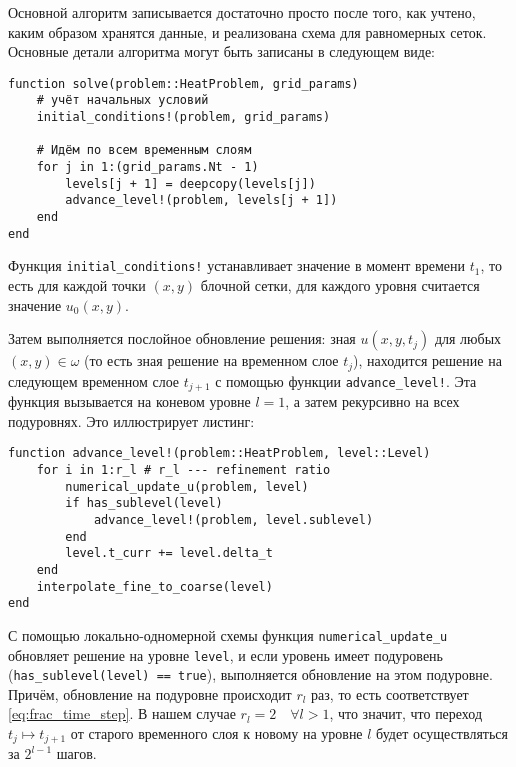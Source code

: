 Основной алгоритм записывается достаточно просто после того, как учтено, каким образом хранятся данные, и реализована схема для равномерных сеток.
Основные детали алгоритма могут быть записаны в следующем виде:
\begin{verbatim}
function solve(problem::HeatProblem, grid_params)
    # учёт начальных условий
    initial_conditions!(problem, grid_params)

    # Идём по всем временным слоям
    for j in 1:(grid_params.Nt - 1)
        levels[j + 1] = deepcopy(levels[j])
        advance_level!(problem, levels[j + 1])
    end
end
\end{verbatim}
Функция \texttt{initial\_conditions!} устанавливает значение в момент времени $t_1$, то есть для каждой точки $(x, y)$ блочной сетки, для каждого уровня считается значение $u_0(x, y)$.

Затем выполняется послойное обновление решения: зная $u(x, y, t_j)$ для любых $(x, y) \in \omega$ (то есть зная решение на временном слое $t_j$), находится решение на следующем временном слое $t_{j + 1}$ с помощью функции \texttt{advance\_level!}.
Эта функция вызывается на коневом уровне $l = 1$, а затем рекурсивно на всех подуровнях.
Это иллюстрирует листинг:
\begin{verbatim}
function advance_level!(problem::HeatProblem, level::Level)
    for i in 1:r_l # r_l --- refinement ratio
        numerical_update_u(problem, level)
        if has_sublevel(level)
            advance_level!(problem, level.sublevel)
        end
        level.t_curr += level.delta_t
    end
    interpolate_fine_to_coarse(level)
end
\end{verbatim}
С помощью локально-одномерной схемы функция \texttt{numerical\_update\_u} обновляет решение на уровне \texttt{level}, и если уровень имеет подуровень (\texttt{has\_sublevel(level) == true}), выполняется обновление на этом подуровне.
Причём, обновление на подуровне происходит $r_l$ раз, то есть соответствует \eqref{eq:frac_time_step}.
В нашем случае $r_l = 2 \quad \forall l > 1$, что значит, что переход $t_j \mapsto t_{j + 1}$ от старого временного слоя к новому на уровне $l$ будет осуществляться за $2^{l - 1}$ шагов.

